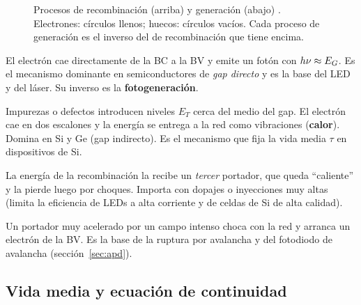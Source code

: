 \begin{figure}[H]
\caption{Procesos de recombinación (arriba) y generación (abajo) . Electrones:
círculos llenos; huecos: círculos vacíos. Cada proceso de generación es el inverso del
de recombinación que tiene encima.}
\label{fig:rg}
\end{figure}

\begin{description}[style=nextline,leftmargin=1.2em]
  \item[Banda a banda (radiativa)] El electrón cae directamente de la BC a la BV y emite un
  fotón con $h\nu\approx E_G$. Es el mecanismo dominante en semiconductores de \emph{gap
  directo} y es la base del LED y del láser. Su inverso es la \textbf{fotogeneración}.
  \item[Por centros R--G (Shockley--Read--Hall)] Impurezas o defectos introducen niveles
  $E_T$ cerca del medio del gap. El electrón cae en dos escalones y la energía se entrega a
  la red como vibraciones (\textbf{calor}). Domina en Si y Ge (gap indirecto). Es el
  mecanismo que fija la vida media $\tau$ en dispositivos de Si.
  \item[Auger] La energía de la recombinación la recibe un \emph{tercer} portador, que
  queda ``caliente'' y la pierde luego por choques. Importa con dopajes o
  inyecciones muy altas (limita la eficiencia de LEDs a alta corriente y de celdas de Si
  de alta calidad).
  \item[Ionización por impacto] Un portador muy acelerado por un campo intenso choca con
  la red y arranca un electrón de la BV. Es la base de la ruptura por avalancha y del
  fotodiodo de avalancha (sección~\ref{sec:apd}).
\end{description}

\subsection{Vida media y ecuación de continuidad}

